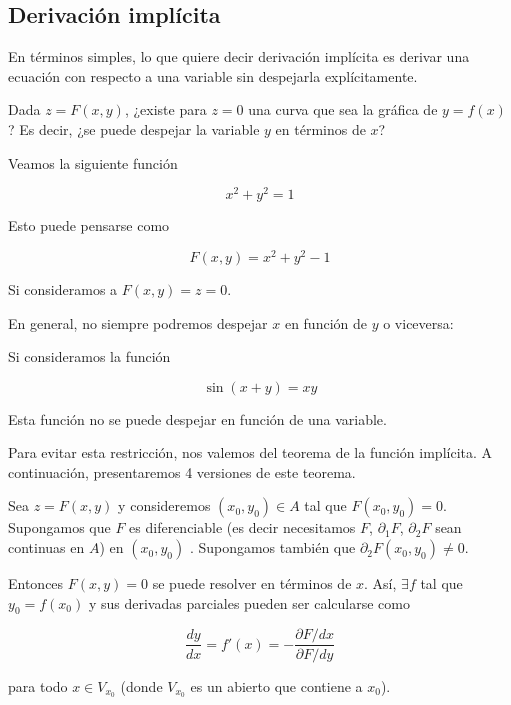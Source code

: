 \subsection{Derivación implícita}

En términos simples, lo que quiere decir derivación implícita es derivar una ecuación con respecto a una variable sin despejarla explícitamente.

\begin{pre}
    Dada $z = F(x,y)$, ¿existe para $z = 0$ una curva que sea la gráfica de $y = f(x)$? Es decir, ¿se puede despejar la variable $y$ en términos de $x$?
\end{pre}

\begin{ejem}
    Veamos la siguiente función
    
    \[
    x^2 + y^2 = 1
    \]
    
    Esto puede pensarse como
    
    \[
    F(x,y) = x^2 + y^2 - 1
    \]
    
    Si consideramos a $F(x,y) = z = 0$.
\end{ejem}

En general, no siempre podremos despejar $x$ en función de $y$ o viceversa:

\begin{ejem}
    Si consideramos la función
    
    \[
    \sin(x+y) = xy
    \]
    
    Esta función no se puede despejar en función de una variable.
\end{ejem}

Para evitar esta restricción, nos valemos del teorema de la función implícita. A continuación, presentaremos 4 versiones de este teorema.

\begin{teo}\label{teo:3.1.1}
    Sea $z = F(x,y)$ y consideremos $(x_0, y_0) \in A$ tal que $F(x_0, y_0) = 0$. Supongamos que $F$ es diferenciable (es decir necesitamos $F$, $\partial_1 F$, $\partial_2 F$ sean continuas en $A$) en $(x_0, y_0)$ . Supongamos también que $\partial_2 F(x_0, y_0) \neq 0$.
    
    Entonces $F(x, y) = 0$ se puede resolver en términos de $x$. Así, $\exists f$ tal que $y_0 = f(x_0)$ y sus derivadas parciales pueden ser calcularse como
    
    \[
    \frac{dy}{dx} = f'(x) = - \frac{\partial F/dx}{\partial F/dy}
    \]
    
    \noindent para todo $x \in V_{x_0}$ (donde $V_{x_0}$ es un abierto que contiene a $x_0$).
\end{teo}

